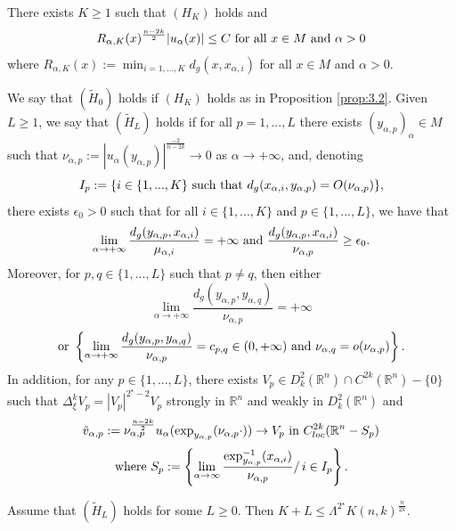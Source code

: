 \documentclass[10pt,a4paper]{amsart}
\def \crit {2^\star}
\def \eps {\epsilon}
\def \mai {\mu_{\alpha,i}}
\def \nap {\nu_{\alpha,p}}
\def \naq {\nu_{\alpha,q}}
\def \rn {\mathbb{R}^n}
\def \tvap {\tilde{v}_{\alpha,p}}
\def \ua {u_\alpha}
\def \xai {x_{\alpha,i}}
\def \yap {y_{\alpha,p}}
\def \yaq {y_{\alpha,q}}
\begin{document}
\begin{proposition}\label{prop:3.2} There exists $K\geq 1$ such that $(H_K)$ holds and 
\begin{equation}\label{hyp:weak:2}
 R_{\alpha, K}(x)^{\frac{n-2k}{2}}|\ua(x)|\leq C\hbox{ for all }x\in M\hbox{ and }\alpha>0
\end{equation}
 where $R_{\alpha, K}(x):=\min_{i=1,...,K}d_g(x,\xai)$ for all $x\in M$ and $\alpha>0$.
\end{proposition}

\begin{defi} We say that $(\tilde{H}_{0})$ holds if $(H_K)$ holds as in Proposition \ref{prop:3.2}. Given $L\geq 1$, we say that $(\tilde{H}_{L})$ holds if for all $p=1,...,L$ there exists $(\yap)_\alpha\in M$ such that $\nap:=|\ua(\yap)|^{\frac{-2}{n-2k}}\to 0$ as  $\alpha\to +\infty$, and, denoting
$$I_p:=\{i\in\{1,...,K\}\hbox{ such that }d_g(\xai,\yap)=O(\nap)\},$$
there exists $\eps_0>0$ such that for all $i\in\{1,...,K\}$ and $p\in\{1,...,L\}$, we have that
\begin{equation}\label{ineq:dist:xai:yap}
\lim_{\alpha\to+\infty}\frac{d_g(\yap,\xai)}{\mai}=+\infty\hbox{ and }\frac{d_g(\yap,\xai)}{\nap}\geq\eps_0.
\end{equation}
Moreover, for $p,q\in \{1,...,L\}$ such that $p\neq q$, then
either 
\begin{equation}\label{ineq:dist:yap:yaq:1}
\lim_{\alpha\to +\infty}\frac{d_g(\yap,\yaq)}{\nap}=+\infty
\end{equation} 
\begin{equation}\label{ineq:dist:xai:yap:yaq:2}
\hbox{or }\left\{\lim_{\alpha\to +\infty}\frac{d_g(\yap,\yaq)}{\nap}=c_{p,q}\in (0,+\infty)\hbox{ and }\naq=o(\nap)\right\}.
\end{equation}
In addition, for any $p\in \{1,...,L\}$, there exists $V_p\in D_k^2(\rn)\cap C^{2k}(\rn)-\{0\}$ such that $\Delta_\xi^k V_p=|V_p|^{\crit-2}V_p$ strongly in $\rn$ and weakly in $D_k^2(\rn)$ and
\begin{equation}\label{cv:tvap}
\tvap :=\nap^{\frac{n-2k}{2}}\ua(\hbox{exp}_{\yap}(\nap \cdot))\to V_p\hbox{ in }C^{2k}_{loc}(\rn-S_p)
\end{equation} 
\begin{equation}\label{def:Sp}
\hbox{where }S_p:=\left\{\lim_{\alpha\to \infty}\frac{\hbox{exp}_{\yap}^{-1}(\xai)}{\nap}/\, i\in I_p\right\}.
\end{equation}
\end{defi}

\begin{proposition}\label{prop:4.4} Assume that $(\tilde{H}_L)$ holds for some $L\geq 0$. Then $K+L\leq \Lambda^{\crit} K(n,k)^{\frac{n}{2k}}$.
\end{proposition}
\end{document}
